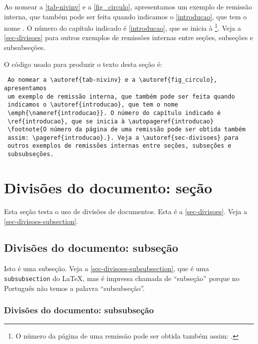 \documentclass[12pt,oneside,a4paper,chapter=TITLE,
			   english,brazil]{abntex2}
\begin{document}
\begin{anexosenv}
Ao nomear a \autoref{tab-nivinv} e a \autoref{fig_circulo}, apresentamos um exemplo de remissão interna, que também pode ser feita quando indicamos o \autoref{introducao}, que tem o nome \emph{}. O número do capítulo indicado é \ref{introducao}, que se inicia à \footnote{O número da página de uma remissão pode ser obtida também assim: \pageref{introducao}.}. Veja a \autoref{sec-divisoes} para outros exemplos de remissões internas entre seções, subseções e subsubseções.

O código usado para produzir o texto desta seção é:
\begin{verbatim}
 Ao nomear a \autoref{tab-nivinv} e a \autoref{fig_circulo}, apresentamos
 um exemplo de remissão interna, que também pode ser feita quando
 indicamos o \autoref{introducao}, que tem o nome
 \emph{\nameref{introducao}}. O número do capítulo indicado é
 \ref{introducao}, que se inicia à \autopageref{introducao}
 \footnote{O número da página de uma remissão pode ser obtida também
 assim: \pageref{introducao}.}. Veja a \autoref{sec-divisoes} para
 outros exemplos de remissões internas entre seções, subseções e 
 subsubseções.
\end{verbatim}

\section{Divisões do documento: seção}\label{sec-divisoes}

Esta seção testa o uso de divisões de documentos. Esta é a \autoref{sec-divisoes}. Veja a \autoref{sec-divisoes-subsection}.

\subsection{Divisões do documento: subseção}\label{sec-divisoes-subsection}

Isto é uma subseção. Veja a \autoref{sec-divisoes-subsubsection}, que é uma \texttt{subsubsection} do \LaTeX, mas é impressa chamada de ``subseção'' porque no Português não temos a palavra ``subsubseção''.

\subsubsection{Divisões do documento: subsubseção}
\label{sec-divisoes-subsubsection}


\end{anexosenv}
\end{document}
